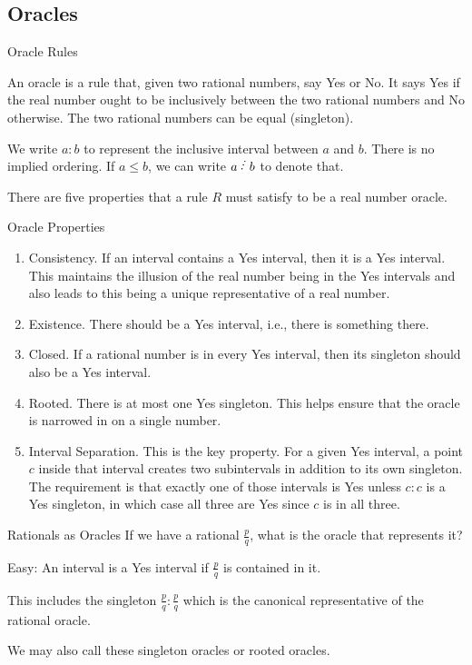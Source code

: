 \documentclass{beamer}
\begin{document}
\subsection{Oracles}

\begin{frame}{Oracle Rules}

    An oracle is a rule that, given two rational numbers, say Yes or No. It says Yes if the real number ought to be inclusively between the two rational numbers and No otherwise. The two rational numbers can be equal (singleton). 

    We write $a:b$ to represent the inclusive interval between $a$ and $b$. There is no implied ordering. If $a \leq b$, we can write $a \lte b$ to denote that. 

    There are five properties that a rule $R$ must satisfy to be a real number oracle. 

\end{frame}

\begin{frame}{Oracle Properties}

\begin{enumerate}
    \item Consistency. If an interval contains a Yes interval, then it is a Yes interval. This maintains the illusion of the real number being in the Yes intervals and also leads to this being a unique representative of a real number. 
    \pause
    \item Existence. There should be a Yes interval, i.e., there is something there. 
    \pause
    \item Closed. If a rational number is in every Yes interval, then its singleton should also be a Yes interval. 
    \pause
    \item Rooted. There is at most one Yes singleton.  This helps ensure that the oracle is narrowed in on a single number. 
    \pause
    \item Interval Separation. This is the key property. For a given Yes interval, a point $c$ inside that interval creates two subintervals in addition to its own singleton. The requirement is that exactly one of those intervals is Yes unless $c:c$ is a Yes singleton, in which case all three are Yes since $c$ is in all three.  
\end{enumerate}

\end{frame}

\begin{frame}{Rationals as Oracles}
    If we have a rational $\frac{p}{q}$, what is the oracle that represents it? 

    \pause

    Easy: An interval is a Yes interval if $\frac{p}{q}$ is contained in it. 

    This includes the singleton $\frac{p}{q}:\frac{p}{q}$ which is the canonical representative of the rational oracle. 

    We may also call these singleton oracles or rooted oracles. 
\end{frame}
\end{document}
